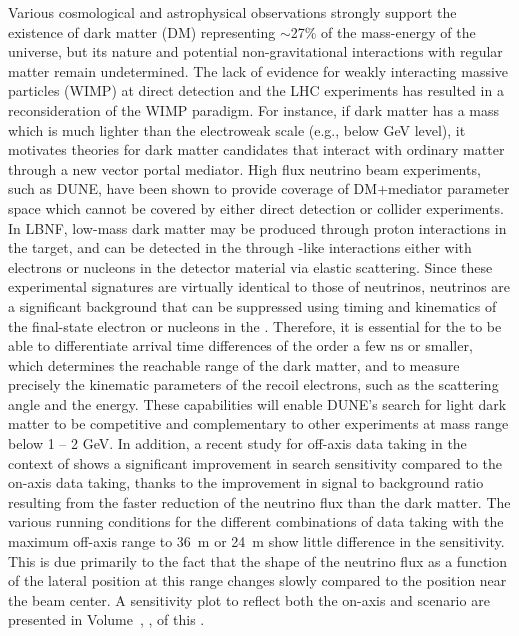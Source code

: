 Various cosmological and astrophysical observations strongly support the existence of dark matter (DM) representing $\sim$27\% of the mass-energy of the universe, but its nature and potential non-gravitational interactions with regular matter remain undetermined. The lack of evidence for weakly interacting massive particles (WIMP) at direct detection and the LHC experiments has resulted in a reconsideration of the WIMP paradigm. For instance, if dark matter has a mass which is much lighter than the electroweak scale (e.g., below GeV level), it motivates theories for dark matter candidates that interact with ordinary matter through a new vector portal mediator. High flux neutrino beam experiments, such as DUNE, have been shown to provide coverage of DM+mediator parameter space which cannot be covered by either direct detection or collider experiments. 
In LBNF, low-mass dark matter may be produced through proton interactions in the target, and can be detected in the  through -like interactions either with electrons or nucleons in the detector material via elastic scattering.  Since these experimental signatures are virtually identical to those of neutrinos, neutrinos are a significant background that can be suppressed using timing and kinematics of the final-state electron or nucleons in the . Therefore, it is essential for the  to be able to differentiate arrival time differences of the order a few ns or smaller, which determines the reachable range of the dark matter, and to measure precisely the kinematic parameters of the recoil electrons, such as the scattering angle and the energy.  These capabilities will enable DUNE's search for light dark matter to be competitive and complementary to other experiments at mass range below 1 – 2 GeV.
In addition, a recent study for off-axis data taking in the context of  \cite{DeRomeri:2019kic} shows a significant improvement in search sensitivity compared to the on-axis data taking, thanks to the improvement in signal to background ratio resulting from the faster reduction of the neutrino flux than the dark matter. The various running conditions for the different combinations of data taking with the maximum off-axis range to 36~m or 24~m show little difference in the sensitivity. This is due primarily to the fact that the shape of the neutrino flux as a function of the lateral position at this range changes slowly compared to the position near the beam center. A sensitivity plot to reflect both the on-axis and  scenario are presented in Volume~\volnumberphysics, \voltitlephysics{}, of this .

